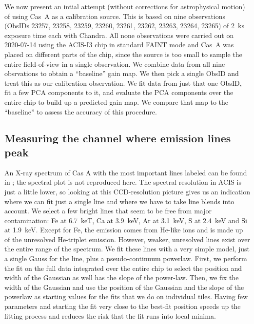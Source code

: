 \documentclass[]{spie}  %
\begin{document}
We now present an intial attempt (without corrections for astrophysical motion) of using Cas~A as a calibration source.
This is based on nine observations (ObsIDs 23257, 23258, 23259, 23260, 23261, 23262, 23263, 23264, 23265) of 2~ks exposure time each with Chandra. All none observations were carried out on 2020-07-14 using the ACIS-I3 chip in standard FAINT mode and Cas~A was placed on different parts of the chip, since the source is too small to sample the entire field-of-view in a single observation. We combine data from all nine obsrvations to obtain a ``baseline'' gain map. We then pick a single ObsID and treat this as our calibration observation. We fit data from just that one ObsID, fit a few PCA components to it, and evaluate the PCA components over the entire chip to build up a predicted gain map. We compare that map to the ``baseline'' to assess the accuracy of this procedure.

\subsection{Measuring the channel where emission lines peak}
An X-ray spectrum of Cas A with the most important lines labeled can be found in ; the spectral plot is not reproduced here. The spectral resolution in ACIS is just a little lower, so looking at this CCD-resolution picture gives us an indication where we can fit just a single line and where we have to take line blends into account. We select a few bright lines that seem to be free from major contamination: Fe at 6.7~keT, Ca at 3.9~keV, Ar at 3.1~keV, S at 2.4~keV and Si at 1.9~keV. Except for Fe, the emission comes from He-like ions and is made up of the unresolved He-triplet emission. However, weaker, unresolved lines exist over the entire range of the spectrum. We fit these lines with a very simple model, just a single Gauss for the line, plus a pseudo-continuum powerlaw. First, we perform the fit on the full data integrated over the entire chip to select the position and width of the Gaussian as well has the slope of the power-law. Then, we fix the width of the Gaussian and use the position of the Gaussian and the slope of the powerlaw as starting values for the fits that we do on individual tiles. Having few parameters and starting the fit very close to the best-fit position speeds up the fitting process and reduces the risk that the fit runs into local minima.
\end{document}
